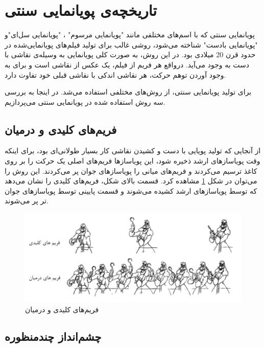\section{تاریخچه‌ی پویانمایی سنتی}

پویانمایی سنتی که با اسم‌های مختلفی مانند "پویانمایی مرسوم" ، "پویانمایی سل‌ای"و "پویانمایی بادست" شناخته می‌شود، روشی 
غالب برای تولید فیلم‌های پویانمایی‌شده در حدود قرن 20 میلادی بود.
در این روش، به صورت کلی پویانمایی به وسیله‌ی نقاشی با دست به وجود می‌آید.
درواقع هر فریم از فیلم، یک عکس از نقاشی است و
برای به وجود آوردن توهم حرکت، هر نقاشی اندکی با نقاشی قبلی خود تفاوت دارد.

برای تولید پویانمایی سنتی، از روش‌های مختلفی استفاده می‌شد. در اینجا به بررسی
سه روش استفاده شده در پویانمایی سنتی می‌پردازیم.
 
\subsection{فریم‌های کلیدی و درمیان}
از آنجایی که تولید پویایی با دست و کشیدن نقاشی کار بسیار طولانی‌ای بود، برای اینکه وقت پویاساز‌های ارشد 
ذخیره شود، این پویاساز‌ها فریم‌های اصلی یک حرکت را بر روی کاغذ ترسیم می‌کردند و 
فریم‌های میانی را پویاساز‌های جوان پر می‌کردند.
این روش را می‌توان در شکل 
\ref{fig:KeyframeAnimation}
مشاهده کرد. 
قسمت‌ بالای شکل، فریم‌های کلیدی را نشان می‌دهد که توسط پویاسازهای ارشد کشیده می‌شوند 
و قسمت پایینی توسط پویاساز‌های جوان تر پر می‌شوند.
\begin{figure}[ht]
	\centerline{\includegraphics[width=\textwidth,height=\textheight,keepaspectratio]{Figures/Ch1/KeyframeAnimation.png}}

	\caption{فریم‌های کلیدی و درمیان \cite{Keyframeberkeley}}
	\label{fig:KeyframeAnimation}
\end{figure}

\subsection{چشم‌انداز چندمنظوره}

